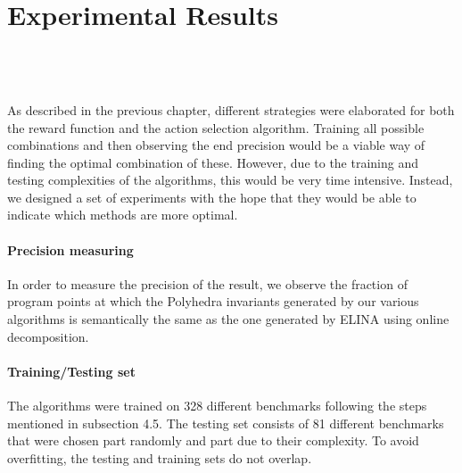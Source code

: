 
\chapter{Experimental Results}
\mbox{}\\
\mbox{}\\
\mbox{}\\
As described in the previous chapter, different strategies were elaborated for both the reward function and the action selection algorithm. Training all possible combinations and then observing the end precision would be a viable way of finding the optimal combination of these. However, due to the training and testing complexities of the algorithms, this would be very time intensive. Instead, we designed a set of experiments with the hope that they would be able to indicate which methods are more optimal.
\subsubsection{Precision measuring}
In order to measure the precision of the result, we observe the fraction of program points at which the Polyhedra invariants generated by our various algorithms is semantically the same as the one generated by ELINA using online decomposition.
\subsubsection{Training/Testing set}
The algorithms were trained on 328 different benchmarks following the steps mentioned in subsection 4.5. The testing set consists of 81 different benchmarks that were chosen part randomly and part due to their complexity. To avoid overfitting, the testing and training sets do not overlap.


